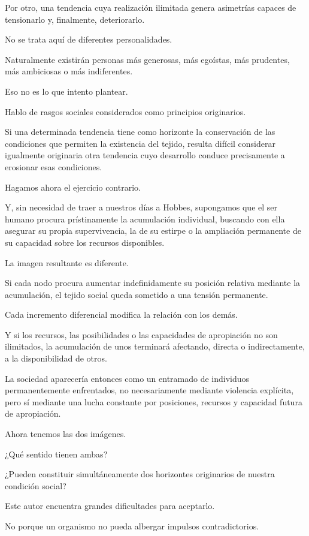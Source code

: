 \documentclass[12pt,a4paper]{article}
\begin{document}
Por otro, una tendencia cuya realización ilimitada genera asimetrías capaces de tensionarlo y, finalmente, deteriorarlo.

No se trata aquí de diferentes personalidades.

Naturalmente existirán personas más generosas, más egoístas, más prudentes, más ambiciosas o más indiferentes.

Eso no es lo que intento plantear.

Hablo de rasgos sociales considerados como principios originarios.

Si una determinada tendencia tiene como horizonte la conservación de las condiciones que permiten la existencia del tejido, resulta difícil considerar igualmente originaria otra tendencia cuyo desarrollo conduce precisamente a erosionar esas condiciones.

Hagamos ahora el ejercicio contrario.

Y, sin necesidad de traer a nuestros días a Hobbes, supongamos que el ser humano procura prístinamente la acumulación individual, buscando con ella asegurar su propia supervivencia, la de su estirpe o la ampliación permanente de su capacidad sobre los recursos disponibles.

La imagen resultante es diferente.

Si cada nodo procura aumentar indefinidamente su posición relativa mediante la acumulación, el tejido social queda sometido a una tensión permanente.

Cada incremento diferencial modifica la relación con los demás.

Y si los recursos, las posibilidades o las capacidades de apropiación no son ilimitados, la acumulación de unos terminará afectando, directa o indirectamente, a la disponibilidad de otros.

La sociedad aparecería entonces como un entramado de individuos permanentemente enfrentados, no necesariamente mediante violencia explícita, pero sí mediante una lucha constante por posiciones, recursos y capacidad futura de apropiación.

Ahora tenemos las dos imágenes.

¿Qué sentido tienen ambas?

¿Pueden constituir simultáneamente dos horizontes originarios de nuestra condición social?

Este autor encuentra grandes dificultades para aceptarlo.

No porque un organismo no pueda albergar impulsos contradictorios.
\end{document}
